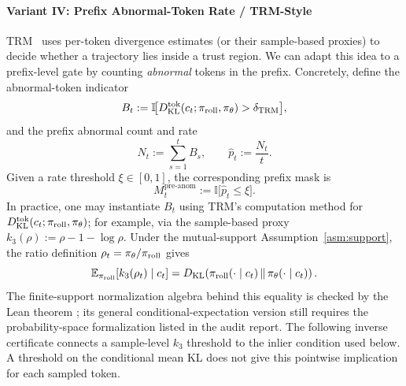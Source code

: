 \paragraph{Variant IV: Prefix Abnormal-Token Rate / TRM-Style}

TRM~\citep{li2025trm} uses per-token divergence estimates (or their sample-based proxies) to decide whether a trajectory lies inside a
trust region. We can adapt this idea to a prefix-level gate by counting \emph{abnormal} tokens in the prefix. Concretely, define the
abnormal-token indicator
\begin{equation*}
    B_t := \mathbb{I}\!\big[D_{\mathrm{KL}}^{\mathrm{tok}}(c_t;\pi_{\mathrm{roll}},\pi_{\theta}) > \delta_{\mathrm{TRM}}\big],
\end{equation*}
and the prefix abnormal count and rate
\begin{equation*}
    N_t := \sum_{s=1}^{t} B_s,
    \qquad
    \widehat{p}_t := \frac{N_t}{t}.
\end{equation*}
Given a rate threshold $\xi\in[0,1]$, the corresponding prefix mask is
\begin{equation*}
    M_t^{\mathrm{pre\text{-}anom}}
    := \mathbb{I}\!\big[\widehat{p}_t \le \xi\big].
\end{equation*}
In practice, one may instantiate $B_t$ using TRM's computation method for $D_{\mathrm{KL}}^{\mathrm{tok}}(c_t;\pi_{\mathrm{roll}},\pi_{\theta})$; for example, via the
sample-based proxy $k_3(\rho):=\rho-1-\log\rho$. Under the mutual-support Assumption~\ref{asm:support}, the ratio
definition $\rho_t=\pi_{\theta}/\pi_{\mathrm{roll}}$ gives
\begin{equation*}
    \mathbb{E}_{\pi_{\mathrm{roll}}}\!\left[k_3(\rho_t)\mid c_t\right]
    = D_{\mathrm{KL}}\!\left(\pi_{\mathrm{roll}}(\cdot\mid c_t)\,\|\,\pi_{\theta}(\cdot\mid c_t)\right).
\end{equation*}
The finite-support normalization algebra behind this equality is checked by
the Lean theorem ; its general
conditional-expectation version still requires the probability-space
formalization listed in the audit report.
The following inverse certificate connects a sample-level $k_3$ threshold to the
inlier condition used below. A threshold on the conditional mean KL does not
give this pointwise implication for each sampled token.

